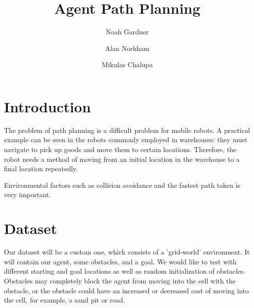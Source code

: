 \documentclass[sigplan,screen]{acmart}
\begin{document}
\title{Agent Path Planning}
\author{Noah Gardner}

\author{Alan Norkham}

\author{Mikulas Chalupa}
\renewcommand{\shortauthors}{Gardner et al.}

\begin{abstract}
\end{abstract}
\maketitle

\section{Introduction}
The problem of path planning is a difficult problem for mobile robots. A
practical example can be seen in the robots commonly employed in warehouses:
they must navigate to pick up goods and move them to certain locations.
Therefore, the robot needs a method of moving from an initial location in the
warehouse to a final location repeatedly.

Environmental factors such as collision avoidance and the fastest path taken is
very important.

\section{Dataset}
Our dataset will be a custom one, which consists of a 'grid-world' environment.
It will contain our agent, some obstacles, and a goal. We would like to test
with different starting and goal locations as well as random initialization of
obstacles. Obstacles may completely block the agent from moving into the cell
with the obstacle, or the obstacle could have an increased or decreased cost of
moving into the cell, for example, a sand pit or road.
\end{document}
